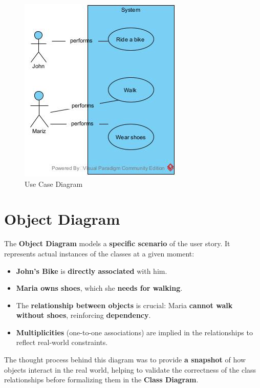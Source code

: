 \begin{figure}[H]
    \centering
    \includegraphics[scale=0.75]{Book-SSW565/jpg/ArchitectureModeling/Use Case Diagram1.jpg}
    \caption{\label{Figure::Use Case Diagram}Use Case Diagram}
\end{figure}


\section{Object Diagram}
The \textbf{Object Diagram} models a \textbf{specific scenario} of the user story. It represents actual instances of the classes at a given moment:
\begin{itemize}
    \item \textbf{John's Bike} is \textbf{directly associated} with him.
    \item \textbf{Maria owns shoes}, which she \textbf{needs for walking}.
    \item The \textbf{relationship between objects} is crucial: Maria \textbf{cannot walk without shoes}, reinforcing \textbf{dependency}.
    \item \textbf{Multiplicities} (one-to-one associations) are implied in the relationships to reflect real-world constraints.
\end{itemize}

The thought process behind this diagram was to provide \textbf{a snapshot} of how objects interact in the real world, helping to validate the correctness of the class relationships before formalizing them in the \textbf{Class Diagram}.

